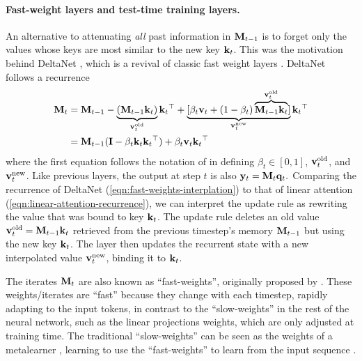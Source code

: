\documentclass[notitlepage, 11pt]{article}
\begin{document}
\paragraph{Fast-weight layers and test-time training layers.}
An alternative to attenuating \emph{all} past information in $\mathbf{M}_{t-1}$ is to forget only the values whose keys are most similar to the new key $\mathbf{k}_t$.
This was the motivation behind DeltaNet \citep{Schlag2021LinearTransformersAre}, which is a revival of classic fast weight layers \citep{Schmidhuber1992LearningControlFastWeight}.
DeltaNet follows a recurrence
\begin{align}
    \mathbf{M}_{t} &= \mathbf{M}_{t-1} - \underbrace{(\mathbf{M}_{t-1}\mathbf{k}_t)}_{\mathbf{v}_{t}^{\text{old}}}\mathbf{k}_t{}^\top + \underbrace{[\beta_t \mathbf{v}_t + (1-\beta_t) \overbrace{\mathbf{M}_{t-1}\mathbf{k}_t}^{\mathbf{v}_t^{\text{old}}}]}_{\mathbf{v}_t^{\text{new}}}\mathbf{k}_t{}^\top \label{eqn:fast-weights-interplation} \\
    &= \mathbf{M}_{t-1}(\mathbf{I} - \beta_t \mathbf{k}_t\mathbf{k}_t{}^\top) + \beta_t \mathbf{v}_t\mathbf{k}_t{}^\top \label{eqn:delta-rule}
\end{align}
where the first equation follows the notation of \citet{Schlag2021LinearTransformersAre} in defining $\beta_t\in [0, 1]$, $\mathbf{v}_t^{\text{old}}$, and $\mathbf{v}_t^{\text{new}}$.
Like previous layers, the output at step $t$ is also $\mathbf{y}_t = \mathbf{M}_t \mathbf{q}_t.$
Comparing the recurrence of DeltaNet (\autoref{eqn:fast-weights-interplation}) to that of linear attention (\autoref{eqn:linear-attention-recurrence}), we can interpret the update rule as rewriting the value that was bound to key $\mathbf{k}_t$. 
The update rule deletes an old value $\mathbf{v}_t^{\text{old}}=\mathbf{M}_{t-1}\mathbf{k}_t$ retrieved from the previous timestep's memory $\mathbf{M}_{t-1}$ but using the new key $\mathbf{k}_t$.
The layer then updates the recurrent state with a new interpolated value $\mathbf{v}_t^{\text{new}}$, binding it to $\mathbf{k}_t$.

The iterates $\mathbf{M}_t$ are also known as ``fast-weights'', originally proposed by \citet{Schmidhuber1992LearningControlFastWeight}.
These weights/iterates are ``fast'' because they change with each timestep, rapidly adapting to the input tokens, in contrast to the ``slow-weights'' in the rest of the neural network, such as the linear projections weights, which are only adjusted at training time.
The traditional ``slow-weights'' can be seen as the weights of a metalearner \citep{Clark2022MetaLearningFastWeight}, learning to use the ``fast-weights'' to learn from the input sequence \citep{Sun2024LearningLearnTest}.
\end{document}
